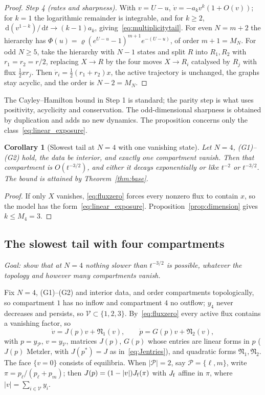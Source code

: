 \documentclass[11pt,a4paper]{article}
\newtheorem{corollary}[theorem]{Corollary}
\theoremstyle{definition}\newtheorem{definition}[theorem]{Definition}
\theoremstyle{remark}\newtheorem{remark}[theorem]{Remark}
\newcommand{\dd}{\,\mathrm d}
\newcommand{\Vs}{\mathcal V}
\newcommand{\Ps}{\mathcal P}
\begin{document}
\begin{proof}
\emph{Step 4 (rates and sharpness).} With $v=U-u$,
$\dot v=-a_kv^k(1+O(v))$; for $k=1$ the logarithmic remainder is
integrable, and for $k\ge2$, $\dd(v^{1-k})/\dd t\to(k-1)a_k$,
giving~\eqref{eq:multiplicitytail}. For even $N=m+2$ the hierarchy has
$\Phi(u)=\varrho(e^{U-u}-1)^{m+1}e^{-(U-u)}$, of order $m+1=M_N$. For odd
$N\ge5$, take the hierarchy with $N-1$ states and split $R$ into $R_1,R_2$
with $r_1=r_2=r/2$, replacing $X\to R$ by the four moves
$X\to R_i$ catalysed by $R_j$ with flux $\tfrac12xr_j$. Then
$\dot r_i=\tfrac12(r_1+r_2)x$, the active trajectory is unchanged, the
graphs stay acyclic, and the order is $N-2=M_N$.
\end{proof}
The Cayley--Hamilton bound in Step 1 is standard; the parity step is
what uses positivity, acyclicity and conservation. The odd-dimensional
sharpness is obtained by duplication and adds no new dynamics.
The proposition concerns only the class~\eqref{eq:linear_exposure}.

\begin{corollary}[Slowest tail at $N=4$ with one vanishing state]
\label{cor:fourslowest}
Let $N=4$, (G1)--(G2) hold, the data be interior, and exactly one
compartment vanish. Then that compartment is $O(t^{-3/2})$, and either
it decays exponentially or like $t^{-2}$ or $t^{-3/2}$. The bound is
attained by Theorem~\ref{thm:base}.
\end{corollary}
\begin{proof}
If only $X$ vanishes, \eqref{eq:fluxzero} forces every nonzero flux to
contain $x$, so the model has the form~\eqref{eq:linear_exposure}.
Proposition~\ref{prop:dimension} gives $k\le M_4=3$.
\end{proof}

\subsection{The slowest tail with four compartments}
\label{sec:fourstate}
\emph{Goal: show that at $N=4$ nothing slower than $t^{-3/2}$ is
possible, whatever the topology and however many compartments vanish.}

Fix $N=4$, (G1)--(G2) and interior data, and order compartments
topologically, so compartment $1$ has no inflow and compartment $4$ no
outflow; $y_4$ never decreases and persists, so $\Vs\subset\{1,2,3\}$.
By~\eqref{eq:fluxzero} every active flux contains a vanishing factor, so
\begin{equation}
\dot v=J(p)v+\mathfrak N_1(v),\qquad \dot p=G(p)v+\mathfrak N_2(v),
\label{eq:split4}
\end{equation}
with $p=y_\Ps$, $v=y_\Vs$, matrices $J(p)$, $G(p)$ whose entries are linear
forms in $p$ ($J(p)$ Metzler, with $J(p^*)=J$ as in~\eqref{eq:Jentries}),
and quadratic forms $\mathfrak N_1,\mathfrak N_2$. The face $\{v=0\}$
consists of equilibria. When $|\Ps|=2$, say $\Ps=\{\ell,m\}$, write
$\pi=p_\ell/(p_\ell+p_m)$; then $J(p)=(1-|v|)J_{\rm f}(\pi)$ with $J_{\rm f}$
affine in $\pi$, where $|v|=\sum_{i\in\Vs}y_i$.
\end{document}
